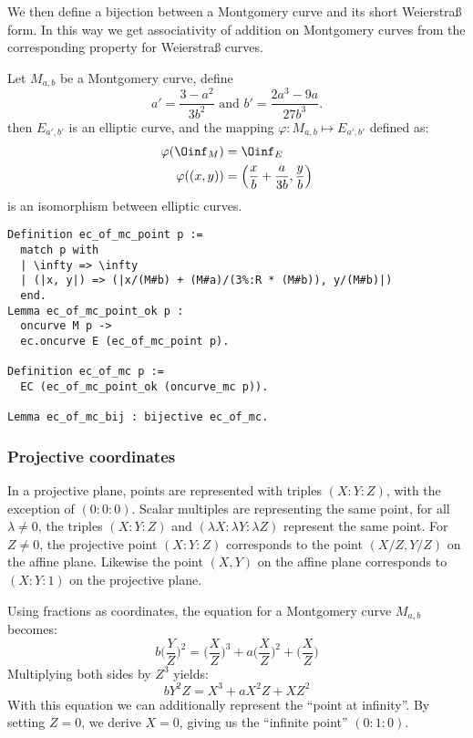 We then define a bijection between a Montgomery curve and its short Weierstra{\ss} form.
In this way we get associativity of addition on Montgomery curves from the
corresponding property for Weierstra{\ss} curves.
\begin{lemma}
  Let $M_{a,b}$ be a Montgomery curve, define
  $$a' = \frac{3-a^2}{3b^2} \text{\ \ \ \ and\ \ \ \ } b' = \frac{2a^3 - 9a}{27b^3}.$$
  then $E_{a',b'}$ is an elliptic curve, and the mapping
  $\varphi : M_{a,b} \mapsto E_{a',b'}$ defined as:
  \begin{align*}
    \varphi(\Oinf_M) &= \Oinf_E\\
    \varphi( (x , y) ) &= \left( \frac{x}{b} + \frac{a}{3b} , \frac{y}{b} \right)
  \end{align*}
  is an isomorphism between elliptic curves.
\end{lemma}
\begin{lstlisting}[language=Coq]
Definition ec_of_mc_point p :=
  match p with
  | \infty => \infty
  | (|x, y|) => (|x/(M#b) + (M#a)/(3%:R * (M#b)), y/(M#b)|)
  end.
Lemma ec_of_mc_point_ok p :
  oncurve M p ->
  ec.oncurve E (ec_of_mc_point p).

Definition ec_of_mc p :=
  EC (ec_of_mc_point_ok (oncurve_mc p)).

Lemma ec_of_mc_bij : bijective ec_of_mc.
\end{lstlisting}

\subsubsection{Projective coordinates}
\label{subsec:ECC-projective}

In a projective plane, points are represented with triples $(X:Y:Z)$,
with the exception of $(0:0:0)$.
Scalar multiples are representing the same point, \ie
for all $\lambda \neq 0$, the triples $(X:Y:Z)$ and $(\lambda X:\lambda Y:\lambda Z)$ represent
the same point.
For $Z\neq 0$, the projective point $(X:Y:Z)$ corresponds to the
point $(X/Z,Y/Z)$ on the affine plane. Likewise the point $(X,Y)$ on the
affine plane corresponds to $(X:Y:1)$ on the projective plane.

Using fractions as coordinates, the equation for a Montgomery curve $M_{a,b}$
becomes:
$$b \bigg(\frac{Y}{Z}\bigg)^2 = \bigg(\frac{X}{Z}\bigg)^3 + a \bigg(\frac{X}{Z}\bigg)^2 + \bigg(\frac{X}{Z}\bigg)$$
Multiplying both sides by $Z^3$ yields:
$$b Y^2Z = X^3 + a X^2Z + XZ^2$$
With this equation we can additionally represent the ``point at infinity''. By
setting $Z=0$, we derive $X=0$, giving us the ``infinite point'' $(0:1:0)$.

